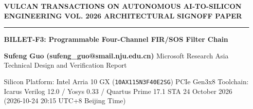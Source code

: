 \documentclass[11pt,a4paper]{article}
\begin{document}
{\scriptsize\sffamily\textcolor{vulcan}{\textbf{VULCAN TRANSACTIONS ON AUTONOMOUS AI-TO-SILICON ENGINEERING \hfill VOL. 2026 \textperiodcentered{} ARCHITECTURAL SIGNOFF PAPER}}\par}

\vspace{1pt}\textcolor{vulcan}{\rule{\textwidth}{1.2pt}}\vspace{4pt}

\begin{center}

{\sffamily\LARGE\bfseries BILLET-F3: Programmable Four-Channel FIR/\allowbreak{}SOS Filter Chain\par}\vspace{3pt}

{\small\sffamily\textbf{Sufeng Guo (\allowbreak{}sufeng\_\allowbreak{}guo@smail.nju.edu.cn)\allowbreak{}} \textperiodcentered{} Microsoft Research Asia \textperiodcentered{} Technical Design and Verification Report\par}\vspace{1pt}

{\scriptsize\sffamily\textcolor{black!75}{Silicon Platform: Intel Arria 10 GX (\texttt{10AX115N3F40E2SG}) PCIe Gen3x8 \textperiodcentered{} Toolchain: Icarus Verilog 12.0 / Yosys 0.33 / Quartus Prime 17.1 STA \textperiodcentered{} 24 October 2026 (\allowbreak{}2026-10-24 20:15 UTC+\allowbreak{}8 Beijing Time)\allowbreak{}}\par}

\end{center}\vspace{2pt}
\end{document}
